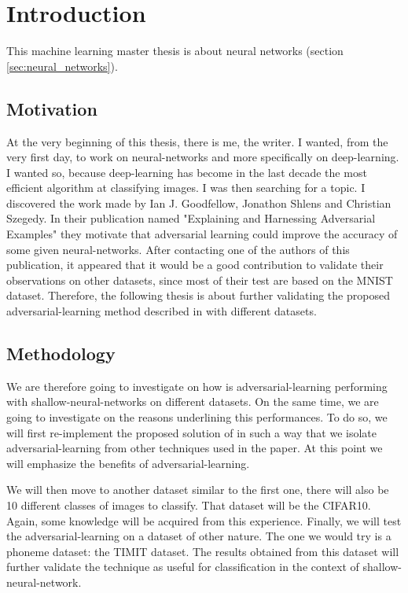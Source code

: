 
\section{Introduction} 
\label{sec:introduction}
	
	This machine learning master thesis is about neural networks (section \ref{sec:neural_networks}). 


	\subsection{Motivation}
		At the very beginning of this thesis, there is me, the writer. I wanted, from the very first day, to work on neural-networks and more specifically on deep-learning. I wanted so, because deep-learning has become in the last decade the most efficient algorithm at classifying images. 
		I was then searching for a topic. I discovered the work made by Ian J. Goodfellow, Jonathon Shlens and Christian Szegedy. In their publication named "Explaining and Harnessing Adversarial Examples"\cite{goodfellow2014explaining} they motivate that adversarial learning could improve the accuracy of some given neural-networks. After contacting one of the authors of this publication, it appeared that it would be a good contribution to validate their observations on other datasets, since most of their test are based on the MNIST dataset\cite{lecun-mnist}. Therefore, the following thesis is about further validating the proposed adversarial-learning method described in \cite{goodfellow2014explaining} with different datasets.

	\subsection{Methodology}
		We are therefore going to investigate on how is adversarial-learning performing with shallow-neural-networks on different datasets. On the same time, we are going to investigate on the reasons underlining this performances. To do so, we will first re-implement the proposed solution of \cite{goodfellow2014explaining} in such a way that we isolate adversarial-learning from other techniques used in the paper. At this point we will emphasize the benefits of adversarial-learning. 

		We will then move to another dataset similar to the first one, there will also be 10 different classes of images to classify. That dataset will be the CIFAR10\cite{CIFAR10_BITCHES}. Again, some knowledge will be acquired from this experience. Finally, we will test the adversarial-learning on a dataset of other nature. The one we would try is a phoneme dataset: the TIMIT dataset\cite{maybe...}. The results obtained from this dataset will further validate the technique as useful for classification in the context of shallow-neural-network.

